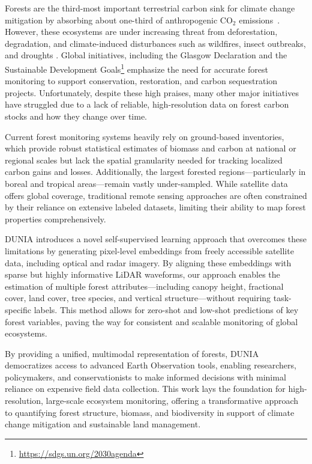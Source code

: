 Forests are the third-most important terrestrial carbon sink for climate change mitigation by absorbing about one-third of anthropogenic $\text{CO}_2$ emissions~\cite{friedlingsteinGlobalCarbonBudget2022}. However, these ecosystems are under increasing threat from deforestation, degradation, and climate-induced disturbances such as wildfires, insect outbreaks, and droughts \cite{anderegg2022climate}. Global initiatives, including the Glasgow Declaration and the Sustainable Development Goals\footnote{\url{https://sdgs.un.org/2030agenda}} emphasize the need for accurate forest monitoring to support conservation, restoration, and carbon sequestration projects. Unfortunately, despite these high praises, many other major initiatives have struggled due to a lack of reliable, high-resolution data on forest carbon stocks and how they change over time.

Current forest monitoring systems heavily rely on ground-based inventories, which provide robust statistical estimates of biomass and carbon at national or regional scales but lack the spatial granularity needed for tracking localized carbon gains and losses. Additionally, the largest forested regions—particularly in boreal and tropical areas—remain vastly under-sampled. While satellite data offers global coverage, traditional remote sensing approaches are often constrained by their reliance on extensive labeled datasets, limiting their ability to map forest properties comprehensively.

DUNIA introduces a novel self-supervised learning approach that overcomes these limitations by generating pixel-level embeddings from freely accessible satellite data, including optical and radar imagery. By aligning these embeddings with sparse but highly informative LiDAR waveforms, our approach enables the estimation of multiple forest attributes—including canopy height, fractional cover, land cover, tree species, and vertical structure—without requiring task-specific labels. This method allows for zero-shot and low-shot predictions of key forest variables, paving the way for consistent and scalable monitoring of global ecosystems.

By providing a unified, multimodal representation of forests, DUNIA democratizes access to advanced Earth Observation tools, enabling researchers, policymakers, and conservationists to make informed decisions with minimal reliance on expensive field data collection. This work lays the foundation for high-resolution, large-scale ecosystem monitoring, offering a transformative approach to quantifying forest structure, biomass, and biodiversity in support of climate change mitigation and sustainable land management.